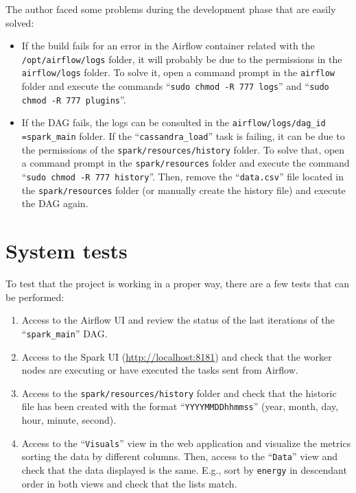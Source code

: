 
\nonzeroparskip The author faced some problems during the development phase that are easily solved:
\begin{itemize}
	\item If the build fails for an error in the Airflow container related with the \texttt{/opt/airflow/logs} folder, it will probably be due to the permissions in the \texttt{airflow/logs} folder. To solve it, open a command prompt in the \texttt{airflow} folder and execute the commands ``\texttt{sudo chmod -R 777 logs}'' and ``\texttt{sudo chmod -R 777 plugins}''.
	\item If the DAG fails, the logs can be consulted in the \texttt{airflow/logs/dag\_id =spark\_main} folder. If the ``\texttt{cassandra\_load}'' task is failing, it can be due to the permissions of the \texttt{spark/resources/history} folder. To solve that, open a command prompt in the \texttt{spark/resources} folder and execute the command ``\texttt{sudo chmod -R 777 history}''. Then, remove the ``\texttt{data.csv}'' file located in the \texttt{spark/resources} folder (or manually create the history file) and execute the DAG again.
\end{itemize}

\section{System tests}
\nonzeroparskip To test that the project is working in a proper way, there are a few tests that can be performed:
\begin{enumerate}
	\item Access to the Airflow UI and review the status of the last iterations of the ``\texttt{spark\_main}'' DAG.
	\item Access to the Spark UI (\url{http://localhost:8181}) and check that the worker nodes are executing or have executed the tasks sent from Airflow.
	\item Access to the \texttt{spark/resources/history} folder and check that the historic file has been created with the format ``\texttt{YYYYMMDDhhmmss}'' (year, month, day, hour, minute, second).
	\item Access to the ``\texttt{Visuals}'' view in the web application and visualize the metrics sorting the data by different columns. Then, access to the ``\texttt{Data}'' view and check that the data displayed is the same. E.g., sort by \texttt{energy} in descendant order in both views and check that the lists match.
\end{enumerate}
